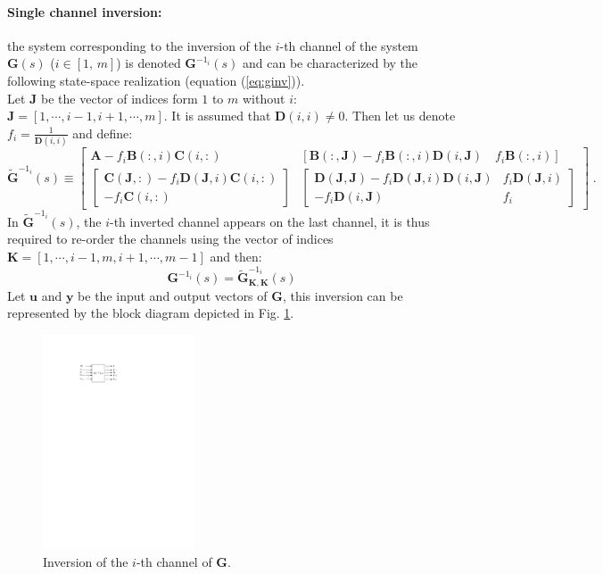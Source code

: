 \documentclass[smallcondensed]{svjour3}     %
\begin{document}
\paragraph{Single channel inversion:} the system corresponding to the inversion of the $i$-th channel of the system $\mathbf{G}(s)$ ($i\in[1,\,m]$) is denoted $\mathbf{G}^{-1_i}(s)$ and can be characterized by the following state-space realization (equation (\ref{eq:ginv})).\\
Let $\mathbf{J}$ be the vector of indices form $1$ to $m$ without $i$: $\mathbf{J}=[1,\cdots,i-1,i+1,\cdots,m]$. It is assumed that $\mathbf{D}(i,i)\neq 0$. Then let us denote $f_i=\frac{1}{\mathbf{D}(i,i)}$  and define:
\[
\widetilde{\mathbf{G}}^{-1_i}(s) \equiv \left[\begin{array}{c|c}\mathbf{A}-f_i\mathbf{B}(:,i)\mathbf{C}(i,:) & [\mathbf{B}(:,\mathbf{J})-f_i\mathbf{B}(:,i)\mathbf{D}(i,\mathbf{J})\quad f_i\mathbf{B}(:,i)] \\ \hline \left[\begin{array}{c}  \mathbf{C}(\mathbf{J},:)-f_i\mathbf{D}(\mathbf{J},i)\mathbf{C}(i,:)\\-f_i\mathbf{C}(i,:)  \end{array}\right] & \left[\begin{array}{cc}\mathbf{D(\mathbf{J},\mathbf{J})}-f_i\mathbf{D}(\mathbf{J},i)\mathbf{D}(i,\mathbf{J}) & f_i\mathbf{D}(\mathbf{J},i)\\
-f_i\mathbf{D}(i,\mathbf{J}) & f_i
\end{array}\right]\end{array}\right]\;.
\]
In $\widetilde{\mathbf{G}}^{-1_i}(s)$, the $i$-th inverted channel appears on the last channel, it is  thus required to re-order the channels using the vector of indices $\mathbf{K}=[1,\cdots,i-1,m, i+1,\cdots,m-1]$ and then:
\begin{equation}\label{eq:ginv}
\mathbf{G}^{-1_i}(s)=\widetilde{\mathbf{G}}^{-1_i}_{\mathbf{K},\mathbf{K}}(s)
\end{equation}
Let $\mathbf{u}$ and $\mathbf{y}$ be the input and output vectors of $\mathbf{G}$, this inversion can be represented by the block diagram depicted in Fig. \ref{fig:inv1c}.
\begin{figure}
  \includegraphics[width=0.4\textwidth]{inv1c}
\caption{Inversion of the $i$-th channel of $\mathbf{G}$.}
\label{fig:inv1c} 
\end{figure}
\end{document}
